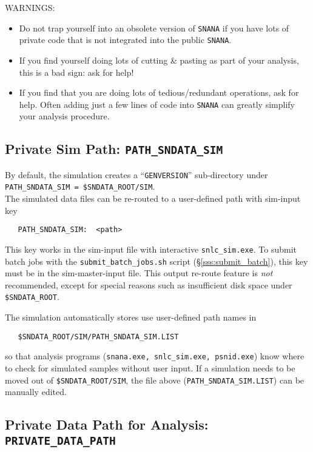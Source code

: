 \documentclass[12pt]{article}
\newcommand{\sndataroot}{{\tt SNDATA\_ROOT}}
\newcommand{\submit}{\tt submit\_batch\_jobs.sh}
\begin{document}
\bigskip\noindent
WARNINGS:
\begin{itemize}
%
  \item Do not trap yourself into an obsolete version of {\tt SNANA}
        if you have lots of private code that is not integrated 
        into the public {\tt SNANA}.
%
  \item If you find yourself doing lots of cutting \& pasting
        as part of your analysis, this is a bad sign: ask for help!
%
 \item If you find that you are doing lots of tedious/redundant
       operations, ask for help. Often adding just a few lines
       of code into {\tt SNANA} can greatly simplify your analysis
       procedure.
\end{itemize}


   \subsection{Private Sim Path:  {\tt PATH\_SNDATA\_SIM} }
   \label{subsec:private_sim}

By default, the simulation creates a ``{\tt GENVERSION}'' sub-directory
under \\
{\tt PATH\_SNDATA\_SIM = \$\sndataroot/SIM}. \\
The simulated data files can be re-routed to a user-defined
path with sim-input key
\begin{verbatim}
   PATH_SNDATA_SIM:  <path>
\end{verbatim}
%
This key works in the sim-input file with interactive {\tt snlc\_sim.exe}.
To submit batch jobs with the {\submit} script
(\S\ref{sss:submit_batch}), this key must be in the sim-master-input file.
This output re-route feature is {\it not} recommended,
except for special reasons such as insufficient 
disk space under {\tt \$\sndataroot}.


The simulation automatically stores use user-defined 
path names in 
\begin{verbatim}
   $SNDATA_ROOT/SIM/PATH_SNDATA_SIM.LIST
\end{verbatim}
so that analysis programs ({\tt snana.exe, snlc\_sim.exe, psnid.exe})
know where to check for simulated samples without user input.
If a simulation needs to be moved out of {\tt \$\sndataroot/SIM},
the file above ({\tt PATH\_SNDATA\_SIM.LIST}) can be manually
edited.

   \subsection{Private Data Path for Analysis:  {\tt PRIVATE\_DATA\_PATH} }
   \label{subsec:private_data}
\end{document}
